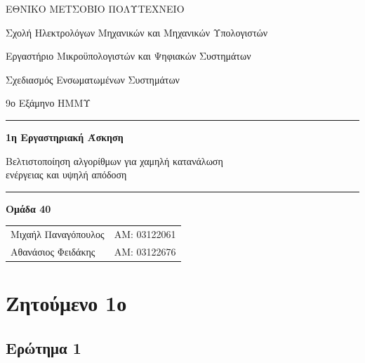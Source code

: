 \documentclass[11pt,a4paper]{article}
\begin{document}
\begin{titlepage}
  \centering
  {\large ΕΘΝΙΚΟ ΜΕΤΣΟΒΙΟ ΠΟΛΥΤΕΧΝΕΙΟ\par}
  {\normalsize Σχολή Ηλεκτρολόγων Μηχανικών και Μηχανικών Υπολογιστών\par}
  {\normalsize Εργαστήριο Μικροϋπολογιστών και Ψηφιακών Συστημάτων\par}
  \vspace{3cm}
  {\Large Σχεδιασμός Ενσωματωμένων Συστημάτων\par}
  \vspace{0.4cm}
  {\normalsize 9ο Εξάμηνο ΗΜΜΥ\par}
  \vspace{1.5cm}
  {\color{accent}\rule{0.8\textwidth}{0.8pt}\par}
  \vspace{0.4cm}
  {\huge\bfseries 1η Εργαστηριακή Άσκηση\par}
  \vspace{0.3cm}
  {\Large Βελτιστοποίηση αλγορίθμων για χαμηλή κατανάλωση\\ ενέργειας και υψηλή απόδοση\par}
  \vspace{0.4cm}
  {\color{accent}\rule{0.8\textwidth}{0.8pt}\par}
  \vfill
  {\large\bfseries Ομάδα 40\par}
  \vspace{0.4cm}
  \begin{tabular}{ll}
    Μιχαήλ Παναγόπουλος & ΑΜ: 03122061 \\
    Αθανάσιος Φειδάκης  & ΑΜ: 03122676 \\
  \end{tabular}
  \vspace{2cm}
\end{titlepage}

\tableofcontents
\newpage

\section{Ζητούμενο 1ο}

\subsection{Ερώτημα 1}
\end{document}
